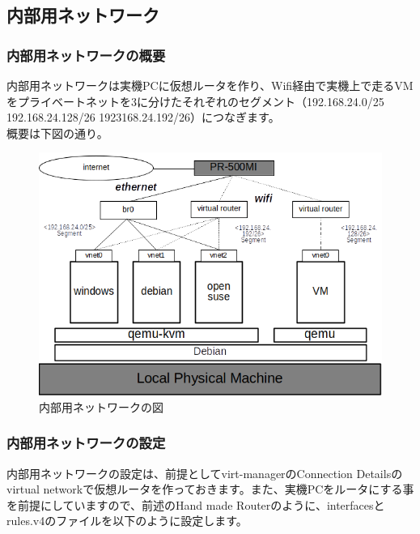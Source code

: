 \documentclass[mingoth,a4paper]{jsarticle}
\begin{document}
\subsection{内部用ネットワーク}
\subsubsection{内部用ネットワークの概要}
内部用ネットワークは実機PCに仮想ルータを作り、Wifi経由で実機上で走るVMをプライベートネットを3に分けたそれぞれのセグメント（192.168.24.0/25 192.168.24.128/26 1923168.24.192/26）につなぎます。\\
概要は下図の通り。

\begin{figure}[!h]
\centering
\includegraphics{image201803-kansai/internal.png}
\caption{内部用ネットワークの図}
\end{figure}
\clearpage

\subsubsection{内部用ネットワークの設定}
内部用ネットワークの設定は、前提としてvirt-managerのConnection Detailsのvirtual networkで仮想ルータを作っておきます。また、実機PCをルータにする事を前提にしていますので、前述のHand made Routerのように、interfacesとrules.v4のファイルを以下のように設定します。
\end{document}
